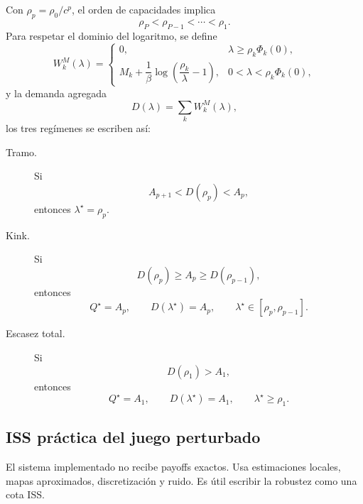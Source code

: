 Con $\rho_p=\rho_0/c^p$, el orden de capacidades implica
\[
  \rho_P<\rho_{P-1}<\cdots<\rho_1.
\]
Para respetar el dominio del logaritmo, se define
\[
  W_k^M(\lambda)=
  \begin{cases}
  0,
  & \lambda\ge \rho_k\Phi_k(0),\\[4pt]
  M_k+\dfrac{1}{\beta}\log\!\left(\dfrac{\rho_k}{\lambda}-1\right),
  & 0<\lambda<\rho_k\Phi_k(0),
  \end{cases}
\]
y la demanda agregada
\[
  D(\lambda)=\sum_k W_k^M(\lambda),
\]
los tres regímenes se escriben así:

\begin{description}
  \item[Tramo.] Si
  \begin{equation}
    A_{p+1}<D(\rho_p)<A_p,
    \label{eq:anexo_condicion_tramo}
  \end{equation}
  entonces $\lambda^\star=\rho_p$.

  \item[Kink.] Si
  \begin{equation}
    D(\rho_p)\ge A_p\ge D(\rho_{p-1}),
    \label{eq:anexo_condicion_kink}
  \end{equation}
  entonces
  \begin{equation}
    Q^\star=A_p,
    \qquad
    D(\lambda^\star)=A_p,
    \qquad
    \lambda^\star\in[\rho_p,\rho_{p-1}].
    \label{eq:anexo_kink}
  \end{equation}

  \item[Escasez total.] Si
  \begin{equation}
    D(\rho_1)>A_1,
    \label{eq:anexo_condicion_escasez}
  \end{equation}
  entonces
  \begin{equation}
    Q^\star=A_1,
    \qquad
    D(\lambda^\star)=A_1,
    \qquad
    \lambda^\star\ge\rho_1.
    \label{eq:anexo_escasez}
  \end{equation}
\end{description}

\subsection{ISS práctica del juego perturbado}
\label{subsec:iss-practica}

El sistema implementado no recibe payoffs exactos. Usa estimaciones locales, mapas
aproximados, discretización y ruido. Es útil escribir la robustez como una cota ISS.

